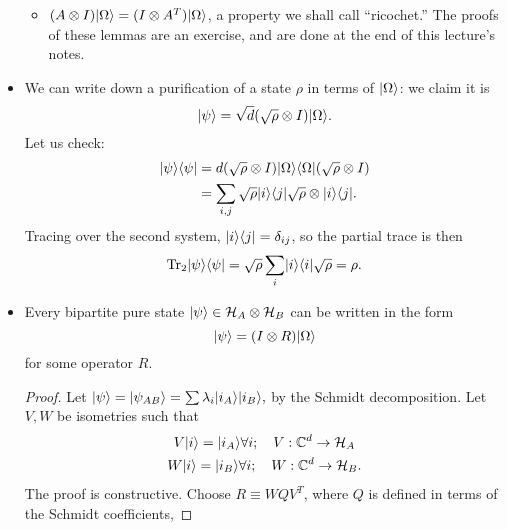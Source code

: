 \begin{itemize}
\begin{itemize}
        \item $(A\otimes I)\lvert\Omega\rangle=(I\otimes A^T)\lvert\Omega\rangle$, a property we shall call ``ricochet.'' The proofs of these lemmas are an exercise, and are done at the end of this lecture's notes.
    \end{itemize}
    \item We can write down a purification of a state $\rho$ in terms of $\lvert\Omega\rangle$: we claim it is
    \begin{equation}
        \lvert\psi\rangle=\sqrt{d}(\sqrt{\rho}\otimes I) \lvert\Omega\rangle.
    \end{equation}
    Let us check:
    \begin{align*}
        \lvert\psi\rangle\langle\psi\rvert&=d(\sqrt{\rho} \otimes I) \lvert\Omega\rangle\langle\Omega\rvert (\sqrt{\rho}\otimes I)\\
            &= \sum_{i,j}\sqrt{\rho}\lvert i\rangle\langle j\rvert\sqrt{\rho} \otimes \lvert i\rangle\langle j\rvert.
    \end{align*}
    Tracing over the second system, $\lvert i\rangle\langle j\rvert=\delta_{ij}$, so the partial trace is then
    \begin{equation}
        \operatorname{Tr}_2 \lvert\psi\rangle\langle\psi\rvert = \sqrt{\rho} \sum_i \lvert i\rangle\langle i\rvert \sqrt{\rho} = \rho.
    \end{equation}
    \item Every bipartite pure state $\lvert\psi\rangle\in \mathcal H_A \otimes \mathcal H_B$ can be written in the form
    \begin{equation}\label{bipartitedecomp}
        \lvert\psi\rangle=(I\otimes R) \lvert\Omega\rangle
    \end{equation}
    for some operator $R$.
    \begin{proof}
        Let $\lvert\psi\rangle=\lvert\psi_{AB}\rangle=\sum \lambda_i \lvert i_A\rangle\lvert i_B\rangle,$ by the Schmidt decomposition. Let $V,W$ be isometries such that
        \begin{gather}
            V\lvert i\rangle=\lvert i_A\rangle\forall i ; \quad V:\mathbb{C}^d \to \mathcal H_A\\
            W\lvert i\rangle=\lvert i_B\rangle\forall i; \quad W:\mathbb{C}^d \to \mathcal H_B.
        \end{gather}
        The proof is constructive. Choose $R \equiv W Q V^T$, where $Q$ is defined in terms of the Schmidt coefficients,

\end{proof}
\end{itemize}
